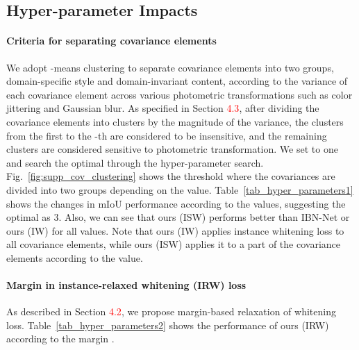 \documentclass[final]{latex/cvpr}
\newcommand{\todow}[1]{\textcolor{red}{#1}}
\begin{document}
\vspace{-0.0cm}
\subsection{Hyper-parameter Impacts}
\vspace{-0.05cm}
\paragraph{Criteria for separating covariance elements}
We adopt -means clustering to separate covariance elements into two groups, domain-specific style and domain-invariant content, according to the variance of each covariance element across various photometric transformations such as color jittering and Gaussian blur. As specified in Section \todow{4.3}, after dividing the covariance elements into  clusters by the magnitude of the variance, the clusters from the first to the -th are considered to be insensitive, and the remaining clusters are considered sensitive to photometric transformation. We set  to one and search the optimal  through the hyper-parameter search. Fig.~\ref{fig:supp_cov_clustering} shows the threshold where the covariances are divided into two groups depending on the  value.
Table~\ref{tab_hyper_parameters1} shows the changes in mIoU performance according to the  values, suggesting the optimal  as 3. Also, we can see that ours (ISW) performs better than IBN-Net or ours (IW) for all  values. Note that ours (IW) applies instance whitening loss to all covariance elements, while ours (ISW) applies it to a part of the covariance elements according to the  value.

\paragraph{Margin  in instance-relaxed whitening (IRW) loss}
\vspace*{-0.3cm}
As described in Section \todow{4.2}, we propose margin-based relaxation of whitening loss. Table~\ref{tab_hyper_parameters2} shows the performance of ours (IRW) according to the margin .
\end{document}
